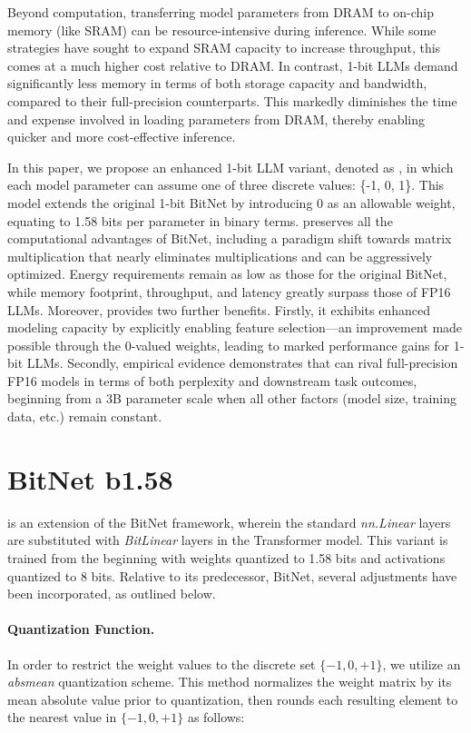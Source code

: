 Beyond computation, transferring model parameters from DRAM to on-chip memory (like SRAM) can be resource-intensive during inference. While some strategies have sought to expand SRAM capacity to increase throughput, this comes at a much higher cost relative to DRAM. In contrast, 1-bit LLMs demand significantly less memory in terms of both storage capacity and bandwidth, compared to their full-precision counterparts. This markedly diminishes the time and expense involved in loading parameters from DRAM, thereby enabling quicker and more cost-effective inference.

In this paper, we propose an enhanced 1-bit LLM variant, denoted as \textbf{}, in which each model parameter can assume one of three discrete values: \{-1, 0, 1\}. This model extends the original 1-bit BitNet by introducing 0 as an allowable weight, equating to 1.58 bits per parameter in binary terms.  preserves all the computational advantages of BitNet, including a paradigm shift towards matrix multiplication that nearly eliminates multiplications and can be aggressively optimized. Energy requirements remain as low as those for the original BitNet, while memory footprint, throughput, and latency greatly surpass those of FP16 LLMs. Moreover,  provides two further benefits. Firstly, it exhibits enhanced modeling capacity by explicitly enabling feature selection—an improvement made possible through the 0-valued weights, leading to marked performance gains for 1-bit LLMs. Secondly, empirical evidence demonstrates that  can rival full-precision FP16 models in terms of both perplexity and downstream task outcomes, beginning from a 3B parameter scale when all other factors (model size, training data, etc.) remain constant.

\section{BitNet b1.58}

 is an extension of the BitNet framework, wherein the standard \emph{nn.Linear} layers are substituted with \emph{BitLinear} layers in the Transformer model. This variant is trained from the beginning with weights quantized to 1.58 bits and activations quantized to 8 bits. Relative to its predecessor, BitNet, several adjustments have been incorporated, as outlined below.

\paragraph{Quantization Function.} In order to restrict the weight values to the discrete set $\{-1, 0, +1\}$, we utilize an \emph{absmean} quantization scheme. This method normalizes the weight matrix by its mean absolute value prior to quantization, then rounds each resulting element to the nearest value in $\{-1, 0, +1\}$ as follows:

